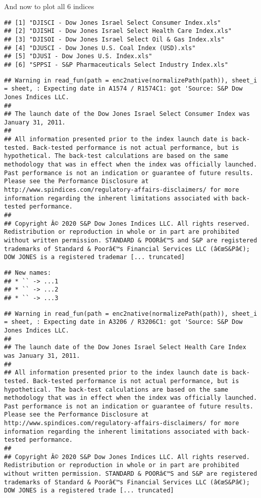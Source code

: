 \documentclass[
]{article}
\begin{document}
And now to plot all 6 indices

\begin{verbatim}
## [1] "DJISCI - Dow Jones Israel Select Consumer Index.xls"   
## [2] "DJISHI - Dow Jones Israel Select Health Care Index.xls"
## [3] "DJISOI - Dow Jones Israel Select Oil & Gas Index.xls"  
## [4] "DJUSCI - Dow Jones U.S. Coal Index (USD).xls"          
## [5] "DJUSI - Dow Jones U.S. Index.xls"                      
## [6] "SPPSI - S&P Pharmaceuticals Select Industry Index.xls"
\end{verbatim}

\begin{verbatim}
## Warning in read_fun(path = enc2native(normalizePath(path)), sheet_i = sheet, : Expecting date in A1574 / R1574C1: got 'Source: S&P Dow Jones Indices LLC.
## 
## The launch date of the Dow Jones Israel Select Consumer Index was January 31, 2011.
## 
## All information presented prior to the index launch date is back-tested. Back-tested performance is not actual performance, but is hypothetical. The back-test calculations are based on the same methodology that was in effect when the index was officially launched. Past performance is not an indication or guarantee of future results.  Please see the Performance Disclosure at http://www.spindices.com/regulatory-affairs-disclaimers/ for more information regarding the inherent limitations associated with back-tested performance.
## 
## Copyright Â© 2020 S&P Dow Jones Indices LLC. All rights reserved. Redistribution or reproduction in whole or in part are prohibited without written permission. STANDARD & POORâ€™S and S&P are registered trademarks of Standard & Poorâ€™s Financial Services LLC (â€œS&Pâ€); DOW JONES is a registered trademar [... truncated]
\end{verbatim}

\begin{verbatim}
## New names:
## * `` -> ...1
## * `` -> ...2
## * `` -> ...3
\end{verbatim}

\begin{verbatim}
## Warning in read_fun(path = enc2native(normalizePath(path)), sheet_i = sheet, : Expecting date in A3206 / R3206C1: got 'Source: S&P Dow Jones Indices LLC.
## 
## The launch date of the Dow Jones Israel Select Health Care Index was January 31, 2011.
## 
## All information presented prior to the index launch date is back-tested. Back-tested performance is not actual performance, but is hypothetical. The back-test calculations are based on the same methodology that was in effect when the index was officially launched. Past performance is not an indication or guarantee of future results.  Please see the Performance Disclosure at http://www.spindices.com/regulatory-affairs-disclaimers/ for more information regarding the inherent limitations associated with back-tested performance.
## 
## Copyright Â© 2020 S&P Dow Jones Indices LLC. All rights reserved. Redistribution or reproduction in whole or in part are prohibited without written permission. STANDARD & POORâ€™S and S&P are registered trademarks of Standard & Poorâ€™s Financial Services LLC (â€œS&Pâ€); DOW JONES is a registered trade [... truncated]
\end{verbatim}
\end{document}
